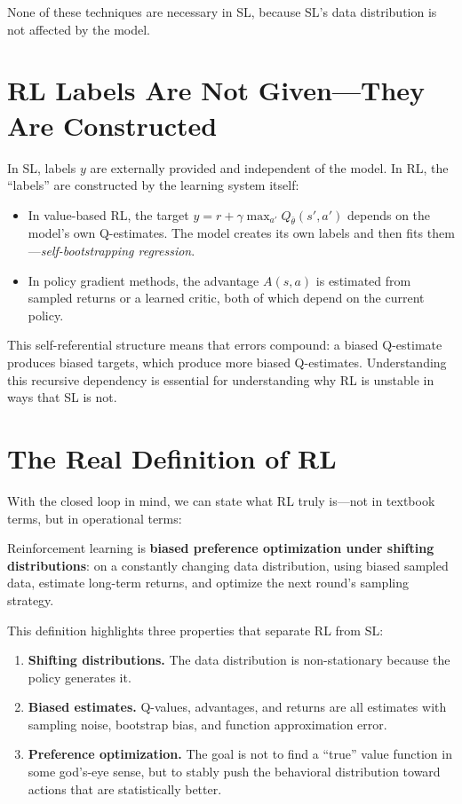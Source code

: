 None of these techniques are necessary in SL, because SL's data distribution is not affected by the model.

\section{RL Labels Are Not Given---They Are Constructed}

In SL, labels $y$ are externally provided and independent of the model.
In RL, the ``labels'' are constructed by the learning system itself:
%
\begin{itemize}
    \item In value-based RL, the target $y = r + \gamma \max_{a'} Q_{\bar\theta}(s', a')$ depends on the model's own Q-estimates.
          The model creates its own labels and then fits them---\emph{self-bootstrapping regression}.
    \item In policy gradient methods, the advantage $A(s,a)$ is estimated from sampled returns or a learned critic, both of which depend on the current policy.
\end{itemize}
%
This self-referential structure means that errors compound: a biased Q-estimate produces biased targets, which produce more biased Q-estimates.
Understanding this recursive dependency is essential for understanding why RL is unstable in ways that SL is not.

\section{The Real Definition of RL}
\label{sec:real-definition}

With the closed loop in mind, we can state what RL truly is---not in textbook terms, but in operational terms:

\begin{keyidea}
Reinforcement learning is \textbf{biased preference optimization under shifting distributions}:
on a constantly changing data distribution, using biased sampled data,
estimate long-term returns, and optimize the next round's sampling strategy.
\end{keyidea}

This definition highlights three properties that separate RL from SL:
\begin{enumerate}
    \item \textbf{Shifting distributions.}  The data distribution is non-stationary because the policy generates it.
    \item \textbf{Biased estimates.}  Q-values, advantages, and returns are all estimates with sampling noise, bootstrap bias, and function approximation error.
    \item \textbf{Preference optimization.}  The goal is not to find a ``true'' value function in some god's-eye sense, but to stably push the behavioral distribution toward actions that are statistically better.
\end{enumerate}

